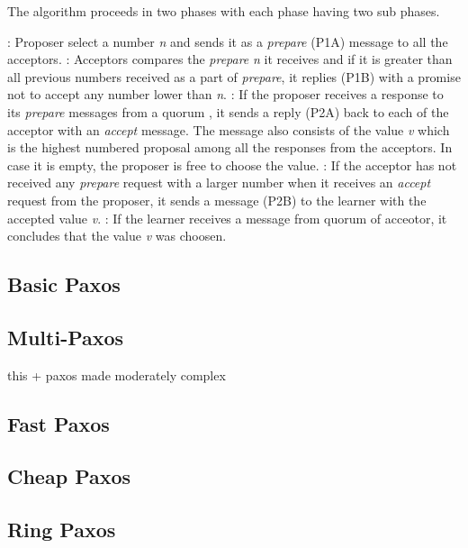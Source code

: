 The algorithm proceeds in two phases with each phase having two sub phases.

\begin{itemize}
  : Proposer select a number \emph{n} and sends it as a
  \emph{prepare} (P1A) message to all the acceptors.
  : Acceptors compares the \emph{prepare} \emph{n} it receives
  and if it is greater than all previous numbers received as a part of 
  \emph{prepare}, it replies (P1B) with a promise not to accept any number lower
  than \emph{n}.
  : If the proposer receives a response to its \emph{prepare}
  messages from a quorum%
  , it sends a reply (P2A) back to each of the acceptor with an \emph{accept} 
  message. The message also consists of the value \emph{v} which is the highest 
  numbered proposal among all the responses from the acceptors. In case it is 
  empty, the proposer is free to choose the value.
  : If the acceptor has not received any \emph{prepare} request
  with a larger number when it receives an \emph{accept} request from the 
  proposer, it sends a message (P2B) to the learner with the accepted value 
  \emph{v}.
  : If the learner receives a message from quorum of acceotor, it
  concludes that the value \emph{v} was choosen.
\end{itemize}  

\subsection{Basic Paxos}

\subsection{Multi-Paxos}

this + paxos made moderately complex

\subsection{Fast Paxos}

\subsection{Cheap Paxos}

\subsection{Ring Paxos}

